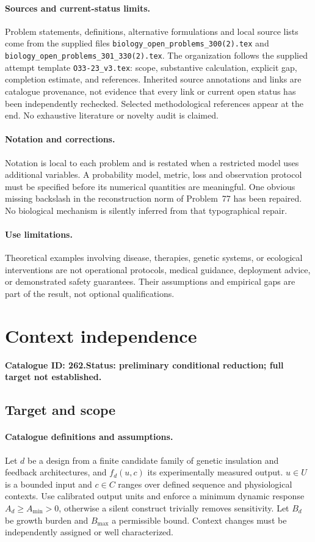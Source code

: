 \documentclass[11pt]{article}
\begin{document}
\paragraph{Sources and current-status limits.}
Problem statements, definitions, alternative formulations and local source lists
come from the supplied files
\texttt{biology\_open\_problems\_300(2).tex} and
\texttt{biology\_open\_problems\_301\_330(2).tex}.
The organization follows the supplied attempt template
\texttt{O33-23\_v3.tex}: scope, substantive calculation, explicit gap,
completion estimate, and references. Inherited source annotations and links are
catalogue provenance, not evidence that every link or current open status has
been independently rechecked. Selected methodological references appear at the
end. No exhaustive literature or novelty audit is claimed.

\paragraph{Notation and corrections.}
Notation is local to each problem and is restated when a restricted model uses
additional variables. A probability model, metric, loss and observation protocol
must be specified before its numerical quantities are meaningful. One obvious
missing backslash in the reconstruction norm of Problem~77 has been repaired.
No biological mechanism is silently inferred from that typographical repair.

\paragraph{Use limitations.}
Theoretical examples involving disease, therapies, genetic systems, or ecological
interventions are not operational protocols, medical guidance, deployment advice,
or demonstrated safety guarantees. Their assumptions and empirical gaps are part
of the result, not optional qualifications.

\setcounter{section}{261}
\section{Context independence}
\label{prob:262}
\noindent\textbf{Catalogue ID: 262.}\quad \textbf{Status: preliminary conditional reduction; full target not established.}
\subsection{Target and scope}
\paragraph{Catalogue definitions and assumptions.}
Let $d$ be a design from a finite candidate family of genetic insulation and feedback architectures, and $f_d(u,c)$ its experimentally measured output. $u\in U$ is a bounded input and $c\in C$ ranges over defined sequence and physiological contexts. Use calibrated output units and enforce a minimum dynamic response $A_d\geq A_{\min}>0$, otherwise a silent construct trivially removes sensitivity. Let $B_d$ be growth burden and $B_{\max}$ a permissible bound. Context changes must be independently assigned or well characterized.
\end{document}

